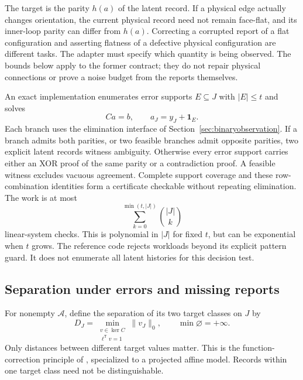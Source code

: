 \documentclass[11pt,a4paper]{article}
\theoremstyle{definition}\newtheorem{definition}[theorem]{Definition}
\begin{document}
The target is the parity $h(a)$ of the latent record. If a physical edge actually changes orientation, the current physical record need not remain face-flat, and its inner-loop parity can differ from $h(a)$. Correcting a corrupted report of a flat configuration and asserting flatness of a defective physical configuration are different tasks. The adapter must specify which quantity is being observed. The bounds below apply to the former contract; they do not repair physical connections or prove a noise budget from the reports themselves.

An exact implementation enumerates error supports $E\subseteq J$ with $|E|\leq t$ and solves
\begin{equation}
 Ca=b,\qquad a_J=y_J+\mathbf1_E.
 \label{eq:errorbranches}
\end{equation}
Each branch uses the elimination interface of Section~\ref{sec:binaryobservation}. If a branch admits both parities, or two feasible branches admit opposite parities, two explicit latent records witness ambiguity. Otherwise every error support carries either an XOR proof of the same parity or a contradiction proof. A feasible witness excludes vacuous agreement. Complete support coverage and these row-combination identities form a certificate checkable without repeating elimination. The work is at most
\begin{equation}
 \sum_{k=0}^{\min(t,|J|)}\binom{|J|}{k}
 \label{eq:errorwork}
\end{equation}
linear-system checks. This is polynomial in $|J|$ for fixed $t$, but can be exponential when $t$ grows. The reference code rejects workloads beyond its explicit pattern guard. It does not enumerate all latent histories for this decision test.

\subsection{Separation under errors and missing reports}
For nonempty $\mathcal A$, define the separation of its two target classes on $J$ by
\begin{equation}
 D_J=\min_{\substack{v\in\ker C\\\ell^{\mathsf T}v=1}}\lVert v_J\rVert_0,
 \qquad \min\varnothing=+\infty.
 \label{eq:targetdistance}
\end{equation}
Only distances between different target values matter. This is the function-correction principle of \citet{lenz2023fcc}, specialized to a projected affine model. Records within one target class need not be distinguishable.
\end{document}
